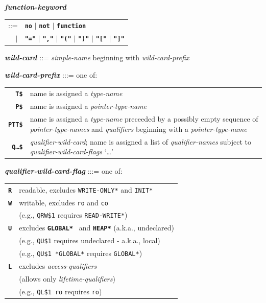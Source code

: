 \documentclass[12pt]{article}
\newcommand{\TT}[1]{{\tt \bfseries #1}}
\newcommand{\ttkey}[1]{{\tt \bfseries #1}}
\newcommand{\emkey}[1]{{\em \bfseries #1}}
\newenvironment{indpar}[1][0.3in]%
	{\begin{list}{}%
		     {\setlength{\itemsep}{0in}%
		      \setlength{\topsep}{0in}%
		      \setlength{\parsep}{1ex}%
		      \setlength{\labelwidth}{#1}%
		      \setlength{\leftmargin}{#1}%
		      \addtolength{\leftmargin}{\labelsep}}%
	 \item}%
	{\end{list}}
\begin{document}
\begin{indpar}
\emkey{function-keyword}
    \begin{tabular}[t]{rl}
    ::= & \TT{no} $|$ \TT{not} $|$ \TT{function} \\
    $|$ & \TT{"="} $|$ \TT{","} $|$ \TT{"("} $|$ \TT{")"} $|$
          \TT{"["} $|$ \TT{"]"}
    \end{tabular}

\emkey{wild-card}\label{WILD-CARD}
    ::= {\em simple-name} beginning with {\em wild-card-prefix}

\emkey{wild-card-prefix}\label{WILD-CARD-PREFIX} :::= one of: \\
\hspace*{0.2in}\begin{tabular}{rp{4in}}
\ttkey{T\$} & name is assigned a {\em type-name} \\
\ttkey{P\$} & name is assigned a {\em pointer-type-name} \\
\ttkey{PTT\$} & name is assigned a {\em type-name} preceeded by a
		possibly empty sequence of {\em pointer-type-names}
	        and {\em qualifiers} beginning with
	        a {\em pointer-type-name} \\
\ttkey{Q\ldots\$} & {\em qualifier-wild-card}; name is assigned a
                    list of {\em qualifier-names} subject to
		    {\em qualifier-wild-card-flags} `\ldots'\\
\end{tabular}

\emkey{qualifier-wild-card-flag}\label{QUALIFIER-WILD-FLAG} :::= one of: \\
\hspace*{0.2in}\begin{tabular}{rl}
\ttkey{R} & readable, excludes {\tt *WRITE-ONLY*} and {\tt *INIT*} \\
\ttkey{W} & writable, excludes {\tt ro} and {\tt co} \\
          & (e.g., {\tt QRW\$1} requires {\tt *READ-WRITE*}) \\
\ttkey{U} & excludes \TT{*GLOBAL*} ~and \TT{*HEAP*} (a.k.a., undeclared) \\
          & (e.g., {\tt QU\$1} requires undeclared - a.k.a., local) \\
          & (e.g., {\tt QU\$1 *GLOBAL*} requires {\tt *GLOBAL*}) \\
\ttkey{L} & excludes {\em access-qualifiers} \\
          & (allows only {\em lifetime-qualifiers}) \\
          & (e.g., {\tt QL\$1 ro} requires {\tt ro}) \\
\end{tabular}


\end{indpar}
\end{document}
